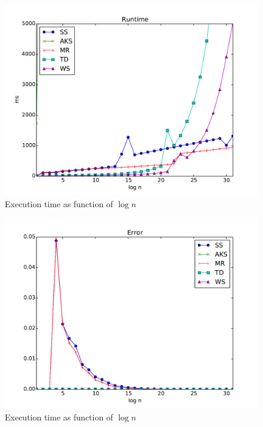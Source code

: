 \begin{figure}
        \centering
        \includegraphics[width=\columnwidth]{results/runtime.pdf}
        \caption{Execution time as function of $\log n$}
        \label{fig:runtime}
\end{figure}

\begin{figure}
        \centering
        \includegraphics[width=\columnwidth]{results/performance.pdf}
        \caption{Execution time as function of $\log n$}
        \label{fig:results}
\end{figure}




